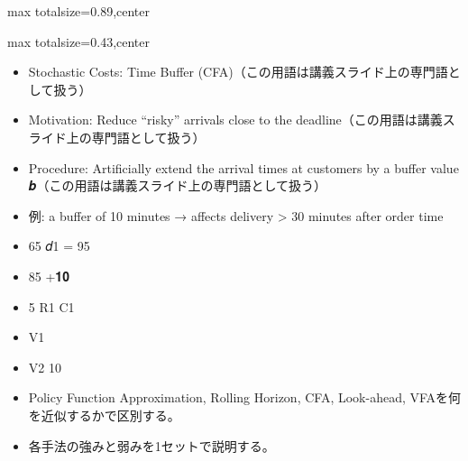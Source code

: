 \begin{minipage}[t]{0.58\textwidth}
\begin{adjustbox}{max totalsize={\textwidth}{0.89\textheight},center}
\begin{minipage}{\textwidth}
\end{minipage}
\end{adjustbox}
\end{minipage}


\clearpage
{}
\begin{minipage}[t]{0.405\textwidth}
\begin{adjustbox}{max totalsize={\textwidth}{0.43\textheight},center}
\begin{minipage}{\textwidth}\scriptsize
{}\begin{itemize}
\item Stochastic Costs: Time Buffer (CFA)（この用語は講義スライド上の専門語として扱う）
\item Motivation: Reduce “risky” arrivals close to the deadline（この用語は講義スライド上の専門語として扱う）
\item Procedure: Artificially extend the arrival times at customers by a buffer value 𝒃（この用語は講義スライド上の専門語として扱う）
\item 例: a buffer of 10 minutes → affects delivery > 30 minutes after order time
\item 65 𝑑1 = 95
\item 85 +𝟏𝟎
\item 5 R1 C1
\item V1
\item V2 10
\end{itemize}\begin{itemize}
\item Policy Function Approximation, Rolling Horizon, CFA, Look-ahead, VFAを何を近似するかで区別する。
\item 各手法の強みと弱みを1セットで説明する。
\end{itemize}
\end{minipage}
\end{adjustbox}
\end{minipage}\hfill
